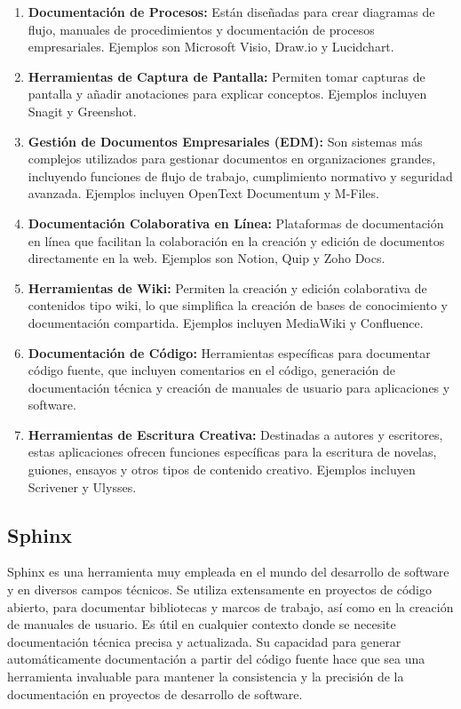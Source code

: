 \documentclass[letterpaper]{article}
\begin{document}
\begin{enumerate}[resume*=listWWNumxiv]
\item \textbf{Documentación de Procesos:} Están diseñadas para crear diagramas de flujo, manuales de procedimientos y
documentación de procesos empresariales. Ejemplos son Microsoft Visio, Draw.io y Lucidchart.
\item \textbf{Herramientas de Captura de Pantalla:} Permiten tomar capturas de pantalla y añadir anotaciones para
explicar conceptos. Ejemplos incluyen Snagit y Greenshot.
\item \textbf{Gestión de Documentos Empresariales (EDM):} Son sistemas más complejos utilizados para gestionar
documentos en organizaciones grandes, incluyendo funciones de flujo de trabajo, cumplimiento normativo y seguridad
avanzada. Ejemplos incluyen OpenText Documentum y M-Files.
\item \textbf{Documentación Colaborativa en Línea:} Plataformas de documentación en línea que facilitan la colaboración
en la creación y edición de documentos directamente en la web. Ejemplos son Notion, Quip y Zoho Docs.
\item \textbf{Herramientas de Wiki:} Permiten la creación y edición colaborativa de contenidos tipo wiki, lo que
simplifica la creación de bases de conocimiento y documentación compartida. Ejemplos incluyen MediaWiki y Confluence.
\item \textbf{Documentación de Código:} Herramientas específicas para documentar código fuente, que incluyen comentarios
en el código, generación de documentación técnica y creación de manuales de usuario para aplicaciones y software.
\item \textbf{Herramientas de Escritura Creativa:} Destinadas a autores y escritores, estas aplicaciones ofrecen
funciones específicas para la escritura de novelas, guiones, ensayos y otros tipos de contenido creativo. Ejemplos
incluyen Scrivener y Ulysses.
\end{enumerate}
\subsection{Sphinx}
Sphinx es una herramienta muy empleada en el mundo del desarrollo de software y en diversos campos técnicos. Se utiliza
extensamente en proyectos de código abierto, para documentar bibliotecas y marcos de trabajo, así como en la creación
de manuales de usuario. Es útil en cualquier contexto donde se necesite documentación técnica precisa y actualizada. Su
capacidad para generar automáticamente documentación a partir del código fuente hace que sea una herramienta invaluable
para mantener la consistencia y la precisión de la documentación en proyectos de desarrollo de software.
\end{document}
